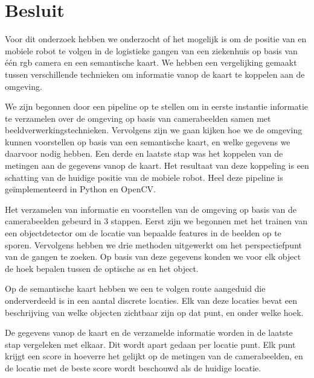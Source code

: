 \chapter{Besluit}

Voor dit onderzoek hebben we onderzocht of het mogelijk is om de positie van en mobiele robot te volgen in de logistieke gangen van een ziekenhuis
op basis van \'{e}\'{e}n \gls{rgb} camera en een semantische kaart.
We hebben een vergelijking gemaakt tussen verschillende technieken om informatie vanop de kaart te koppelen aan de omgeving.

We zijn begonnen door een pipeline op te stellen om in eerste instantie informatie te verzamelen over de omgeving op basis van camerabeelden samen met beeldverwerkingstechnieken.
Vervolgens zijn we gaan kijken hoe we de omgeving kunnen voorstellen op basis van een semantische kaart, en welke gegevens we daarvoor nodig hebben.
Een derde en laatste stap was het koppelen van de metingen aan de gegevens vanop de kaart.
Het resultaat van deze koppeling is een schatting van de huidige positie van de mobiele robot.
Heel deze pipeline is ge\"{i}mplementeerd in Python en OpenCV.

Het verzamelen van informatie en voorstellen van de omgeving op basis van de camerabeelden gebeurd in 3 stappen.
Eerst zijn we begonnen met het trainen van een objectdetector om de locatie van bepaalde features in de beelden op te sporen.
Vervolgens hebben we drie methoden uitgewerkt om het perspectiefpunt van de gangen te zoeken.
Op basis van deze gegevens konden we voor elk object de hoek bepalen tussen de optische as en het object.

Op de semantische kaart hebben we een te volgen route aangeduid die onderverdeeld is in een aantal discrete locaties.
Elk van deze locaties bevat een beschrijving van welke objecten zichtbaar zijn op dat punt, en onder welke hoek.

De gegevens vanop de kaart en de verzamelde informatie worden in de laatste stap vergeleken met elkaar.
Dit wordt apart gedaan per locatie punt.
Elk punt krijgt een score in hoeverre het gelijkt op de metingen van de camerabeelden, en de locatie met de beste score wordt beschouwd als
de huidige locatie.

